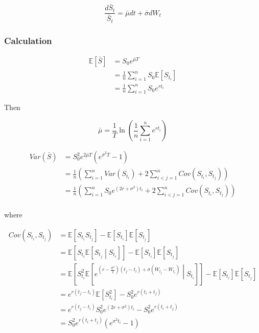 \documentclass{article}
\begin{document}
\begin{equation}
	\frac{d\bar{S}_t}{\bar{S}_t} = \bar{\mu}dt + \bar{\sigma} dW_t
\end{equation}

\subsubsection{Calculation}

\begin{equation}
\begin{aligned}
	\mathbb{E}\left[\bar{S}\right] &= S_0 e^{\bar{\mu} T}\\
	&= \frac{1}{n} \sum_{i=1}^{n} S_0\mathbb{E}\left[S_{t_i}\right]\\
	&= \frac{1}{n} \sum_{i=1}^{n} S_0 e^{r t_i}
\end{aligned}
\end{equation}

\noindent Then 

\begin{equation}	
	\bar{\mu} = \frac{1}{T} \ln\left(\frac{1}{n} \sum_{i=1}^{n} e^{r t_i}\right)
\end{equation}

\begin{equation}
\begin{aligned}
	Var\left(\bar{S}\right) &= S_0^2 e^{2\bar{\mu}T}\left( e^{\bar{\sigma}^2 T} - 1\right)\\
	&= \frac{1}{n} \left(\sum_{i=1}^{n} Var\left(S_{t_i}\right) + 2 \sum_{i < j = 1}^{n} Cov\left(S_{t_i}, S_{t_j}\right)\right)\\
	&= \frac{1}{n} \left(\sum_{i=1}^{n} S_0 e^{\left(2r + \sigma^2\right) t_i}+ 2 \sum_{i < j = 1}^{n} Cov\left(S_{t_i}, S_{t_j}\right)\right)\\
\end{aligned}
\end{equation}

\noindent where 

\begin{equation}
\begin{aligned}
	Cov\left(S_{t_i}, S_{t_j}\right) &= \mathbb{E}\left[S_{t_i} S_{t_j}\right] - \mathbb{E}\left[S_{t_i} \right] \mathbb{E}\left[S_{t_j}\right]\\
	&= \mathbb{E}\left[ S_{t_i} \mathbb{E}\left[S_{t_j}  \middle | S_{t_i} \right] \right]  - \mathbb{E}\left[S_{t_i} \right] \mathbb{E}\left[S_{t_j}\right]\\
	&= \mathbb{E}\left[ S_{t_i}^2 \mathbb{E}\left[e^{\left(r - \frac{\sigma^2}{2}\right)\left(t_j - t_i\right) + \sigma \left(W_{t_j} - W_{t_i}\right)} \middle | S_{t_i} \right] \right]  - \mathbb{E}\left[S_{t_i} \right] \mathbb{E}\left[S_{t_j}\right]\\
	&= e^{r\left(t_j - t_i\right)} \mathbb{E}\left[S_{t_i}^2\right] - S_0^2 e^{r\left(t_i + t_j\right)}\\
	&= e^{r\left(t_j - t_i\right)} S_0^2 e^{\left(2r + \sigma^2\right)t_i} - S_0^2 e^{r\left(t_i + t_j\right)}\\
	&= S_0^2 e^{r\left(t_i + t_j\right)} \left( e^{ \sigma^2 t_i }  - 1\right)
\end{aligned}
\end{equation}
\end{document}
